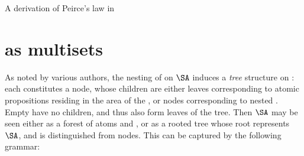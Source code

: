 \begin{marginfigure}
  
  \caption{A derivation of Peirce's law in }
\end{marginfigure}



\section{ as multisets}

As noted by various authors, the nesting of  on $\SA$ induces a
\emph{tree} structure on : each  constitutes a node, whose children are
either leaves corresponding to atomic propositions residing in the area of the
, or nodes corresponding to nested . Empty  have no children, and
thus also form leaves of the tree. Then $\SA$ may be seen either as a forest of
atoms and , or as a rooted tree whose root represents $\SA$, and is
distinguished from  nodes. This can be captured by the following grammar:

